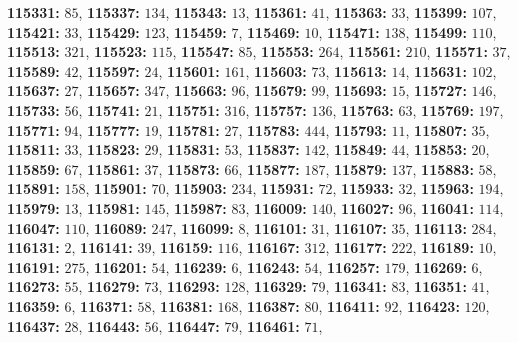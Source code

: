 \textsf{\bfseries 115331:} $85$, \textsf{\bfseries 115337:} $134$, \textsf{\bfseries 115343:} $13$, \textsf{\bfseries 115361:} $41$, \textsf{\bfseries 115363:} $33$, \textsf{\bfseries 115399:} $107$, \textsf{\bfseries 115421:} $33$, \textsf{\bfseries 115429:} $123$, \textsf{\bfseries 115459:} $7$, \textsf{\bfseries 115469:} $10$, \textsf{\bfseries 115471:} $138$, \textsf{\bfseries 115499:} $110$, \textsf{\bfseries 115513:} $321$, \textsf{\bfseries 115523:} $115$, \textsf{\bfseries 115547:} $85$, \textsf{\bfseries 115553:} $264$, \textsf{\bfseries 115561:} $210$, \textsf{\bfseries 115571:} $37$, \textsf{\bfseries 115589:} $42$, \textsf{\bfseries 115597:} $24$, \textsf{\bfseries 115601:} $161$, \textsf{\bfseries 115603:} $73$, \textsf{\bfseries 115613:} $14$, \textsf{\bfseries 115631:} $102$, \textsf{\bfseries 115637:} $27$, \textsf{\bfseries 115657:} $347$, \textsf{\bfseries 115663:} $96$, \textsf{\bfseries 115679:} $99$, \textsf{\bfseries 115693:} $15$, \textsf{\bfseries 115727:} $146$, \textsf{\bfseries 115733:} $56$, \textsf{\bfseries 115741:} $21$, \textsf{\bfseries 115751:} $316$, \textsf{\bfseries 115757:} $136$, \textsf{\bfseries 115763:} $63$, \textsf{\bfseries 115769:} $197$, \textsf{\bfseries 115771:} $94$, \textsf{\bfseries 115777:} $19$, \textsf{\bfseries 115781:} $27$, \textsf{\bfseries 115783:} $444$, \textsf{\bfseries 115793:} $11$, \textsf{\bfseries 115807:} $35$, \textsf{\bfseries 115811:} $33$, \textsf{\bfseries 115823:} $29$, \textsf{\bfseries 115831:} $53$, \textsf{\bfseries 115837:} $142$, \textsf{\bfseries 115849:} $44$, \textsf{\bfseries 115853:} $20$, \textsf{\bfseries 115859:} $67$, \textsf{\bfseries 115861:} $37$, \textsf{\bfseries 115873:} $66$, \textsf{\bfseries 115877:} $187$, \textsf{\bfseries 115879:} $137$, \textsf{\bfseries 115883:} $58$, \textsf{\bfseries 115891:} $158$, \textsf{\bfseries 115901:} $70$, \textsf{\bfseries 115903:} $234$, \textsf{\bfseries 115931:} $72$, \textsf{\bfseries 115933:} $32$, \textsf{\bfseries 115963:} $194$, \textsf{\bfseries 115979:} $13$, \textsf{\bfseries 115981:} $145$, \textsf{\bfseries 115987:} $83$, \textsf{\bfseries 116009:} $140$, \textsf{\bfseries 116027:} $96$, \textsf{\bfseries 116041:} $114$, \textsf{\bfseries 116047:} $110$, \textsf{\bfseries 116089:} $247$, \textsf{\bfseries 116099:} $8$, \textsf{\bfseries 116101:} $31$, \textsf{\bfseries 116107:} $35$, \textsf{\bfseries 116113:} $284$, \textsf{\bfseries 116131:} $2$, \textsf{\bfseries 116141:} $39$, \textsf{\bfseries 116159:} $116$, \textsf{\bfseries 116167:} $312$, \textsf{\bfseries 116177:} $222$, \textsf{\bfseries 116189:} $10$, \textsf{\bfseries 116191:} $275$, \textsf{\bfseries 116201:} $54$, \textsf{\bfseries 116239:} $6$, \textsf{\bfseries 116243:} $54$, \textsf{\bfseries 116257:} $179$, \textsf{\bfseries 116269:} $6$, \textsf{\bfseries 116273:} $55$, \textsf{\bfseries 116279:} $73$, \textsf{\bfseries 116293:} $128$, \textsf{\bfseries 116329:} $79$, \textsf{\bfseries 116341:} $83$, \textsf{\bfseries 116351:} $41$, \textsf{\bfseries 116359:} $6$, \textsf{\bfseries 116371:} $58$, \textsf{\bfseries 116381:} $168$, \textsf{\bfseries 116387:} $80$, \textsf{\bfseries 116411:} $92$, \textsf{\bfseries 116423:} $120$, \textsf{\bfseries 116437:} $28$, \textsf{\bfseries 116443:} $56$, \textsf{\bfseries 116447:} $79$, \textsf{\bfseries 116461:} $71$, 
